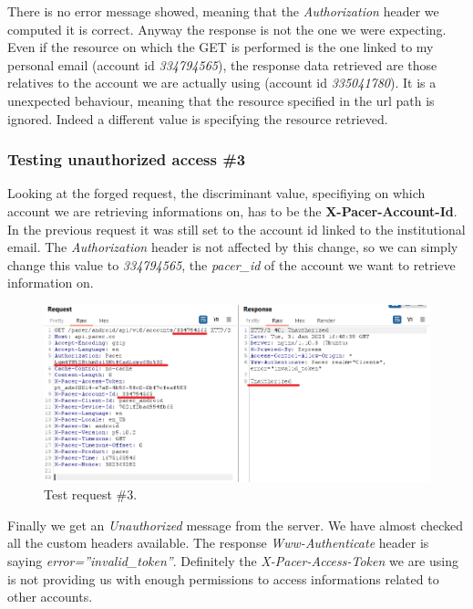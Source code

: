 			\newpage
			\par There is no error message showed, meaning that the \textit{Authorization} header we computed it is correct. Anyway the response is not the one we were expecting. Even if the resource on which the GET is performed is the one linked to my personal email (account id \textit{334794565}), the response data retrieved are those relatives to the account we are actually using (account id \textit{335041780}). It is a unexpected behaviour, meaning that the resource specified in the url path is ignored. Indeed a different value is specifying the resource retrieved.
			
		\subsubsection{Testing unauthorized access \#3}
			\par Looking at the forged request, the discriminant value, specifiying on which account we are retrieving informations on, has to be the \textbf{X-Pacer-Account-Id}. In the previous request it was still set to the account id linked to the institutional email. \newline
			The \textit{Authorization} header is not affected by this change, so we can simply change this value to \textit{334794565}, the \textit{pacer\_id} of the account we want to retrieve information on.
			\newpage
			\begin{figure}[ht]
				\centering
				\includegraphics[width=\textwidth]{images/pacer4.png}
				\caption{Test request \#3.}
			\end{figure}
			\par Finally we get an \textit{Unauthorized} message from the server. We have almost checked all the custom headers available. The response \textit{Www-Authenticate} header is saying \textit{error=''invalid\_token''}. Definitely the \textit{X-Pacer-Access-Token} we are using is not providing us with enough permissions to access informations related to other accounts. 
			
